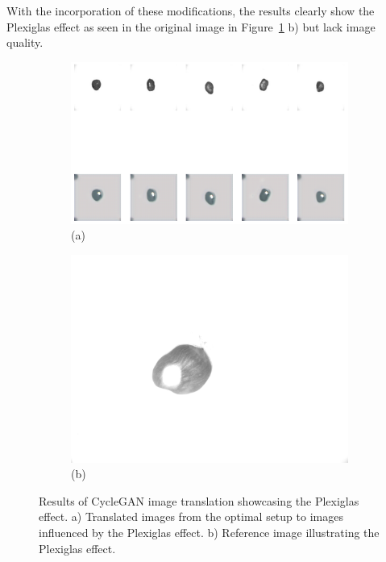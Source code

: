 \documentclass[12pt,DIV14,BCOR12mm,a4paper,footinclude=false,headinclude,parskip=half-,twoside,openright,cleardoublepage=empty,toc=index,bibliography=totoc,listof=totoc]{scrreprt}
\numberwithin{equation}{chapter}
\begin{document}
With the incorporation of these modifications, the results clearly show the Plexiglas effect as seen in the original image in Figure~\ref{fig:plexiglas_result} b) but lack image quality.
\begin{figure}
    \centering
    \begin{subfigure}[b]{1.0\textwidth}
        \centering
        \includegraphics[width=\textwidth]{../media/plexiglas.png}
        \caption*{(a)}
    \end{subfigure}
    \hfill
    \begin{subfigure}[b]{0.25\textwidth}
        \centering
        \includegraphics[width=\textwidth]{../media/plexiglas_real.png}
        \caption*{(b)}
    \end{subfigure}
    \caption{Results of CycleGAN image translation showcasing the Plexiglas effect. a) Translated images from the optimal setup to images influenced by the Plexiglas effect. b) Reference image illustrating the Plexiglas effect.}
    \label{fig:plexiglas_result}
\end{figure}
\end{document}
